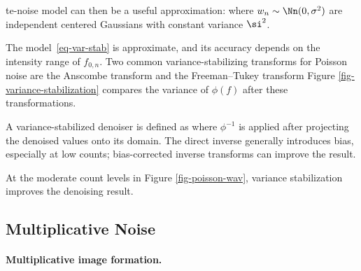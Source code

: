 te-noise model can then be a useful approximation:
where $w_n\sim\Nn(0,\sigma^2)$ are independent centered Gaussians with constant variance $\si^2$.

The model~\eqref{eq-var-stab} is approximate, and its accuracy depends on the intensity range of $f_{0,n}$.
Two common variance-stabilizing transforms for Poisson noise are the Anscombe transform
and the Freeman--Tukey transform
Figure \ref{fig-variance-stabilization} compares the variance of $\phi(f)$ after these transformations.


A variance-stabilized denoiser is defined as
where $\phi^{-1}$ is applied after projecting the denoised values onto its domain. The direct inverse generally introduces bias, especially at low counts; bias-corrected inverse transforms can improve the result.

At the moderate count levels in Figure \ref{fig-poisson-wav}, variance stabilization improves the denoising result.


                                                     
\subsection{Multiplicative Noise}

  
\paragraph{Multiplicative image formation.}

